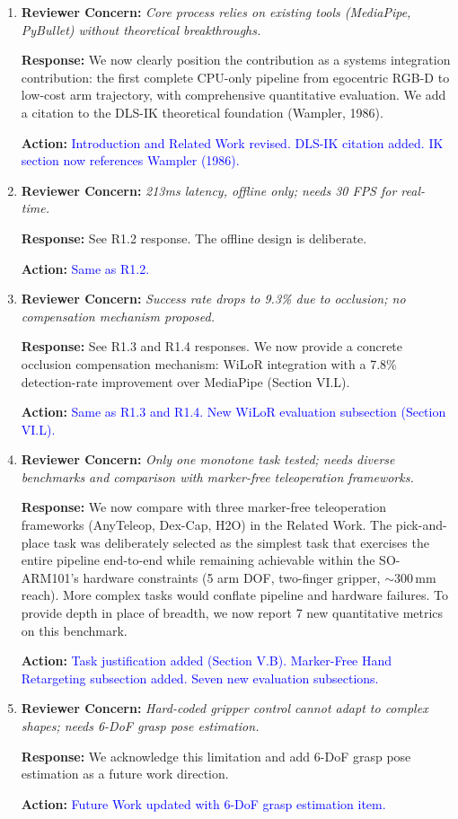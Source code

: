\documentclass[11pt]{article}
\newcommand{\concern}[1]{\textbf{Reviewer Concern:} \textit{#1}}
\newcommand{\response}[1]{\textbf{Response:} #1}
\newcommand{\action}[1]{\textbf{Action:} \textcolor{blue}{#1}}
\begin{document}
\begin{enumerate}[label=\textbf{R2.\arabic*}]

\item \concern{Core process relies on existing tools (MediaPipe, PyBullet) without theoretical breakthroughs.}

\response{We now clearly position the contribution as a systems integration contribution: the first complete CPU-only pipeline from egocentric RGB-D to low-cost arm trajectory, with comprehensive quantitative evaluation. We add a citation to the DLS-IK theoretical foundation (Wampler, 1986).}

\action{Introduction and Related Work revised. DLS-IK citation added. IK section now references Wampler (1986).}

\item \concern{213ms latency, offline only; needs 30 FPS for real-time.}

\response{See R1.2 response. The offline design is deliberate.}

\action{Same as R1.2.}

\item \concern{Success rate drops to 9.3\% due to occlusion; no compensation mechanism proposed.}

\response{See R1.3 and R1.4 responses. We now provide a concrete occlusion compensation mechanism: WiLoR integration with a 7.8\% detection-rate improvement over MediaPipe (Section VI.L).}

\action{Same as R1.3 and R1.4. New WiLoR evaluation subsection (Section VI.L).}

\item \concern{Only one monotone task tested; needs diverse benchmarks and comparison with marker-free teleoperation frameworks.}

\response{We now compare with three marker-free teleoperation frameworks (AnyTeleop, Dex-Cap, H2O) in the Related Work. The pick-and-place task was deliberately selected as the simplest task that exercises the entire pipeline end-to-end while remaining achievable within the SO-ARM101's hardware constraints (5 arm DOF, two-finger gripper, $\sim$300\,mm reach). More complex tasks would conflate pipeline and hardware failures. To provide depth in place of breadth, we now report 7 new quantitative metrics on this benchmark.}

\action{Task justification added (Section V.B). Marker-Free Hand Retargeting subsection added. Seven new evaluation subsections.}

\item \concern{Hard-coded gripper control cannot adapt to complex shapes; needs 6-DoF grasp pose estimation.}

\response{We acknowledge this limitation and add 6-DoF grasp pose estimation as a future work direction.}

\action{Future Work updated with 6-DoF grasp estimation item.}

\end{enumerate}
\end{document}
